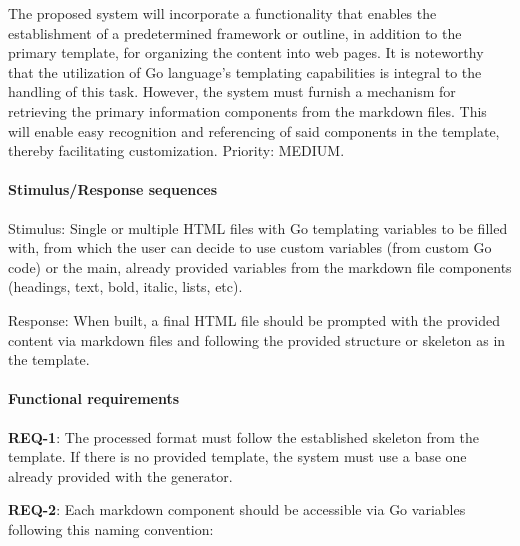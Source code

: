 The proposed system will incorporate a functionality that enables the
establishment of a predetermined framework or outline, in addition to
the primary template, for organizing the content into web pages. It is
noteworthy that the utilization of Go language's templating capabilities
is integral to the handling of this task. However, the system must
furnish a mechanism for retrieving the primary information components
from the markdown files. This will enable easy recognition and
referencing of said components in the template, thereby facilitating
customization. Priority: MEDIUM.

\paragraph{Stimulus/Response
sequences}\label{par:stimulusresponse-sequences-2}

Stimulus: Single or multiple HTML files with Go templating variables to
be filled with, from which the user can decide to use custom variables
(from custom Go code) or the main, already provided variables from the
markdown file components (headings, text, bold, italic, lists, etc).

Response: When built, a final HTML file should be prompted with the
provided content via markdown files and following the provided structure
or skeleton as in the template.

\paragraph{Functional requirements}\label{par:functional-requirements-1}

\textbf{REQ-1}: The processed format must follow the established
skeleton from the template. If there is no provided template, the system
must use a base one already provided with the generator.

\textbf{REQ-2}: Each markdown component should be accessible via Go
variables following this naming convention:

